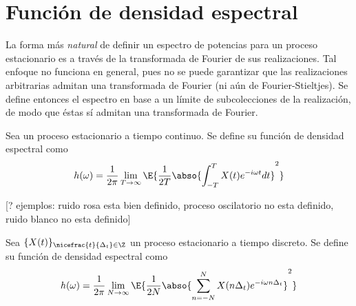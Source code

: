 
\section{Función de densidad espectral}
\label{sec:fde}

La forma más \textit{natural} de definir un espectro de potencias para un proceso estacionario es a través de la transformada de Fourier de sus realizaciones. 
%
Tal enfoque no funciona en general, pues no se puede garantizar que las realizaciones arbitrarias admitan una transformada de Fourier (ni aún de Fourier-Stieltjes).
%
Se define entonces el espectro en base a un límite de subcolecciones de la realización, de modo que éstas sí admitan una transformada de Fourier.

\begin{definicion}
Sea \xt un proceso estacionario a tiempo continuo. Se define su {función de densidad 
espectral} como
\begin{equation}
h(\omega) = \frac{1}{2 \pi} \lim_{T\rightarrow \infty} \E{ \frac{1}{2T} 
\abso{ \int_{-T}^{T} X(t) e^{-i \omega t} dt}^{2} }
\label{txt_FDE_cont}
\end{equation}
\end{definicion}


[? ejemplos: ruido rosa esta bien definido, proceso oscilatorio no esta definido, ruido blanco no esta definido]

\begin{definicion}
Sea $\{X(t)\}_{\nicefrac{t}{\Delta_t}\in \Z}$ un proceso estacionario a tiempo discreto. Se 
define su {función de densidad espectral} como
\begin{equation}
h(\omega) = \frac{1}{2 \pi} \lim_{N\rightarrow \infty} \E{ \frac{1}{2N} 
\abso{ \sum_{n=-N}^{N} X(n \Delta_t) e^{-i \omega n \Delta_t}}^{2} }
\label{txt_FDE_disc}
\end{equation}
\end{definicion}


